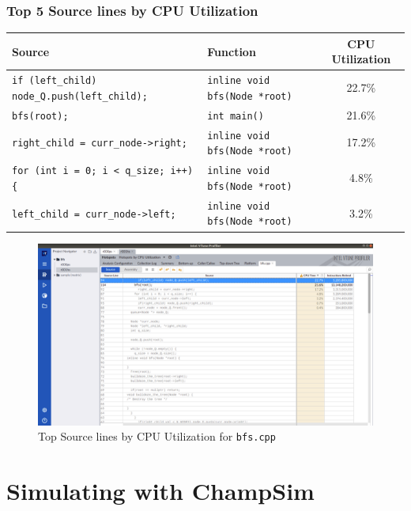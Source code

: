 \documentclass[11pt, swedish, openany]{book}
\begin{document}
\subsection*{Top 5 Source lines by CPU Utilization}
\begin{table}[H]
    \begin{tabular}{||l|l||c||}
        \hline
        Source                                               & Function                             & CPU Utilization \\
        \hline
        \texttt{if (left\_child) node\_Q.push(left\_child);} & \texttt{inline void bfs(Node *root)} & 22.7\%          \\
        \texttt{bfs(root);}                                  & \texttt{int main()}                  & 21.6\%          \\
        \texttt{right\_child = curr\_node->right;}           & \texttt{inline void bfs(Node *root)} & 17.2\%          \\
        \texttt{for (int i = 0; i < q\_size; i++) \{}        & \texttt{inline void bfs(Node *root)} & 4.8\%           \\
        \texttt{left\_child = curr\_node->left;}             & \texttt{inline void bfs(Node *root)} & 3.2\%           \\
        \hline
    \end{tabular}
\end{table}

\begin{figure}[H]
    \centering
    \includegraphics[scale=0.25]{vtune/bfs/sc.png}
    \caption{Top Source lines by CPU Utilization for \texttt{bfs.cpp}}
\end{figure}

\chapter{Simulating with ChampSim}
\end{document}
